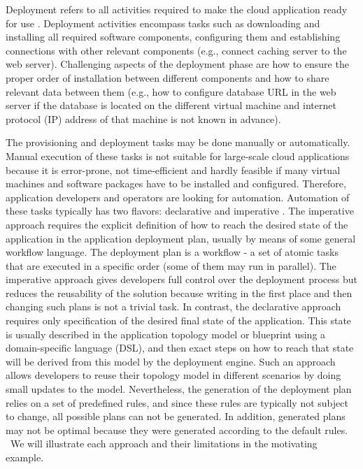 \noindent 

\noindent Deployment refers to all activities required to make the cloud application ready for use \cite{specification2006deployment}. Deployment activities encompass tasks such as downloading and installing all required software components, configuring them and establishing connections with other relevant components (e.g., connect caching server to the web server). Challenging aspects of the deployment phase are how to ensure the proper order of installation between different components and how to share relevant data between them (e.g., how to configure database URL in the web server if the database is located on the different virtual machine and internet protocol (IP) address of that machine is not known in advance).

\noindent 

\noindent The provisioning and deployment tasks may be done manually or automatically. Manual execution of these tasks is not suitable for large-scale cloud applications because it is error-prone, not time-efficient and hardly feasible if many virtual machines and software packages have to be installed and configured. Therefore, application developers and operators are looking for automation. Automation of these tasks typically has two flavors: declarative and imperative \cite{INPROC-2013-45}. The imperative approach requires the explicit definition of how to reach the desired state of the application in the application deployment plan, usually by means of some general workflow language. The deployment plan is a workflow - a set of atomic tasks that are executed in a specific order (some of them may run in parallel). The imperative approach gives developers full control over the deployment process but reduces the reusability of the solution because writing in the first place and then changing such plans is not a trivial task. In contrast, the declarative approach requires only specification of the desired final state of the application. This state is usually described in the application topology model or blueprint using a domain-specific language (DSL), and then exact steps on how to reach that state will be derived from this model by the deployment engine. Such an approach allows developers to reuse their topology model in different scenarios by doing small updates to the model. Nevertheless, the generation of the deployment plan relies on a set of predefined rules, and since  these rules are typically not subject to change, all possible plans can not be generated. In addition, generated plans may not be optimal because they were generated according to the default rules. ~We will illustrate each approach and their limitations in the motivating example. 

